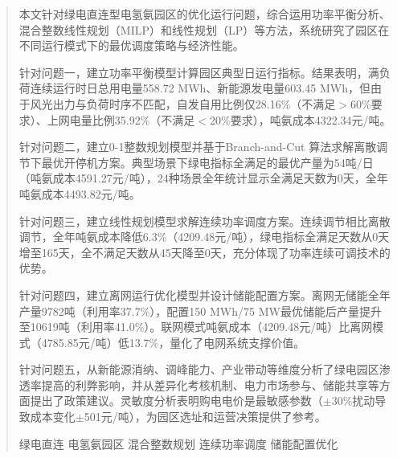 \documentclass[a4paper]{neepumcm}
\begin{document}
\begin{abstract}

本文针对绿电直连型电氢氨园区的优化运行问题，综合运用功率平衡分析、混合整数线性规划（MILP）和线性规划（LP）等方法，系统研究了园区在不同运行模式下的最优调度策略与经济性能。

针对问题一，建立功率平衡模型计算园区典型日运行指标。结果表明，满负荷连续运行时日总用电量558.72 MWh、新能源发电量603.45 MWh，但由于风光出力与负荷时序不匹配，自发自用比例仅28.16\%（不满足$>$60\%要求）、上网电量比例35.92\%（不满足$<$20\%要求），吨氨成本4322.34元/吨。

针对问题二，建立0-1整数规划模型并基于Branch-and-Cut 算法求解离散调节下最优开停机方案。典型场景下绿电指标全满足的最优产量为54吨/日（吨氨成本4591.27元/吨），24种场景全年统计显示全满足天数为0天，全年吨氨成本4493.82元/吨。

针对问题三，建立线性规划模型求解连续功率调度方案。连续调节相比离散调节，全年吨氨成本降低6.3\%（4209.48元/吨），绿电指标全满足天数从0天增至165天，全不满足天数从45天降至0天，充分体现了功率连续可调技术的优势。

针对问题四，建立离网运行优化模型并设计储能配置方案。离网无储能全年产量9782吨（利用率37.7\%），配置150 MWh/75 MW最优储能后产量提升至10619吨（利用率41.0\%）。联网模式吨氨成本（4209.48元/吨）比离网模式（4785.85元/吨）低13.7\%，量化了电网系统支撑价值。

针对问题五，从新能源消纳、调峰能力、产业带动等维度分析了绿电园区渗透率提高的利弊影响，并从差异化考核机制、电力市场参与、储能共享等方面提出了政策建议。灵敏度分析表明购电电价是最敏感参数（$\pm$30\%扰动导致成本变化$\pm$501元/吨），为园区选址和运营决策提供了参考。

\begin{keywords}
绿电直连 \quad 电氢氨园区 \quad 混合整数规划 \quad 连续功率调度 \quad 储能配置优化
\end{keywords}
\end{abstract}

\maketitle
\newpage
\tableofcontents
\clearpage











\end{document}
